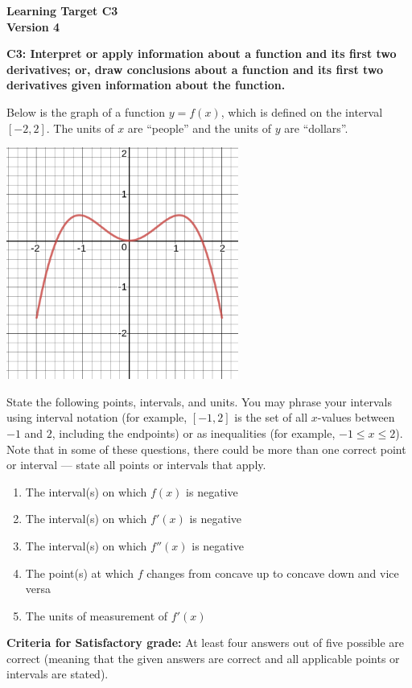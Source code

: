 \documentclass[10pt]{article}
\begin{document}
	\vspace*{0in}

		\begin{center}
			\textbf{Learning Target C3 \\
			Version 4} \\ %
		\end{center}


\begin{framed}
	\textbf{C3: Interpret or apply information about a function and its first two derivatives; or, draw conclusions about a function and its first two derivatives given information about the function. }
\end{framed}

Below is the graph of a function $y = f(x)$, which is defined on the interval $[-2,2]$. The units of $x$ are ``people'' and the units of $y$ are ``dollars''. 
\begin{center}
    \includegraphics[width=3in]{ltv3-v2.png}
\end{center}
State the following points, intervals, and units. You may phrase your intervals using interval notation (for example, $[-1,2]$ is the set of all $x$-values between $-1$ and $2$, including the endpoints) or as inequalities (for example, $-1 \leq x \leq 2$). Note that in some of these questions, there could be more than one correct point or interval --- state all points or intervals that apply. 

\begin{enumerate}
    \item The interval(s) on which $f(x)$ is negative
    \item The interval(s) on which $f'(x)$ is negative
    \item The interval(s) on which $f''(x)$ is negative
    \item The point(s) at which $f$ changes from concave up to concave down and vice versa
    \item The units of measurement of $f'(x)$
\end{enumerate}


\vfill


\begin{small}
    \begin{framed}
        	\textbf{Criteria for Satisfactory grade:} At least four answers out of five possible are correct (meaning that the given answers are correct and all applicable points or intervals are stated). 
    \end{framed}

\end{small}
\end{document}
